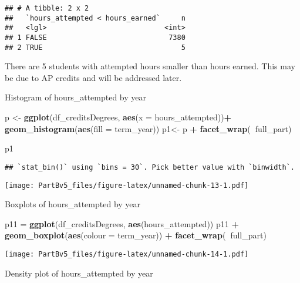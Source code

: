 \documentclass[]{article}
\newenvironment{Shaded}{\begin{snugshade}}{\end{snugshade}}
\newcommand{\DataTypeTok}[1]{\textcolor[rgb]{0.13,0.29,0.53}{#1}}
\newcommand{\KeywordTok}[1]{\textcolor[rgb]{0.13,0.29,0.53}{\textbf{#1}}}
\newcommand{\NormalTok}[1]{#1}
\newcommand{\OperatorTok}[1]{\textcolor[rgb]{0.81,0.36,0.00}{\textbf{#1}}}
\newcommand{\StringTok}[1]{\textcolor[rgb]{0.31,0.60,0.02}{#1}}
\begin{document}
\begin{verbatim}
## # A tibble: 2 x 2
##   `hours_attempted < hours_earned`     n
##   <lgl>                            <int>
## 1 FALSE                             7380
## 2 TRUE                                 5
\end{verbatim}

There are 5 students with attempted hours smaller than hours earned.
This may be due to AP credits and will be addressed later.

Histogram of hours\_attempted by year

\begin{Shaded}
\begin{Highlighting}[]
\NormalTok{p <-}\StringTok{ }\KeywordTok{ggplot}\NormalTok{(df_creditsDegrees, }\KeywordTok{aes}\NormalTok{(}\DataTypeTok{x =}\NormalTok{ hours_attempted))}\OperatorTok{+}\StringTok{ }\KeywordTok{geom_histogram}\NormalTok{(}\KeywordTok{aes}\NormalTok{(}\DataTypeTok{fill =}\NormalTok{ term_year))}
\NormalTok{p1<-}\StringTok{ }\NormalTok{p }\OperatorTok{+}\StringTok{ }\KeywordTok{facet_wrap}\NormalTok{(}\OperatorTok{~}\NormalTok{full_part)}

\NormalTok{p1}
\end{Highlighting}
\end{Shaded}

\begin{verbatim}
## `stat_bin()` using `bins = 30`. Pick better value with `binwidth`.
\end{verbatim}

\texttt{[image: PartBv5\_files/figure-latex/unnamed-chunk-13-1.pdf]}

Boxplots of hours\_attempted by year

\begin{Shaded}
\begin{Highlighting}[]
\NormalTok{p11 =}\StringTok{ }\KeywordTok{ggplot}\NormalTok{(df_creditsDegrees, }\KeywordTok{aes}\NormalTok{(hours_attempted))}
\NormalTok{p11 }\OperatorTok{+}\StringTok{ }\KeywordTok{geom_boxplot}\NormalTok{(}\KeywordTok{aes}\NormalTok{(}\DataTypeTok{colour =}\NormalTok{ term_year)) }\OperatorTok{+}
\StringTok{       }\KeywordTok{facet_wrap}\NormalTok{(}\OperatorTok{~}\NormalTok{full_part)}
\end{Highlighting}
\end{Shaded}

\texttt{[image: PartBv5\_files/figure-latex/unnamed-chunk-14-1.pdf]}

Density plot of hours\_attempted by year
\end{document}
